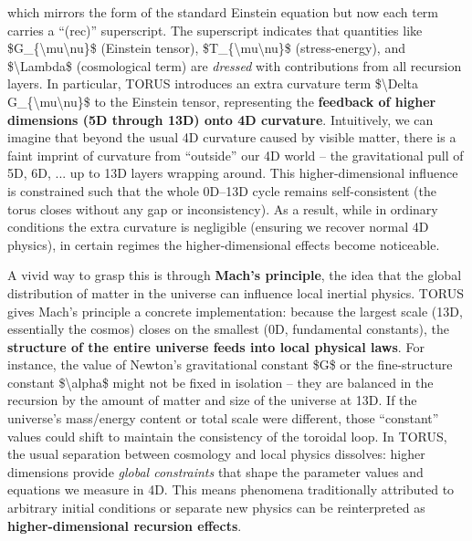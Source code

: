 \documentclass[
]{article}
\begin{document}
which mirrors the form of the standard Einstein equation but now each
term carries a ``(rec)'' superscript\hspace{0pt}. The superscript
indicates that quantities like
\$G\_\{\textbackslash mu\textbackslash nu\}\$ (Einstein tensor),
\$T\_\{\textbackslash mu\textbackslash nu\}\$ (stress-energy), and
\$\textbackslash Lambda\$ (cosmological term) are \emph{dressed} with
contributions from all recursion layers\hspace{0pt}. In particular,
TORUS introduces an extra curvature term \$\textbackslash Delta
G\_\{\textbackslash mu\textbackslash nu\}\$ to the Einstein tensor,
representing the \textbf{feedback of higher dimensions (5D through 13D)
onto 4D curvature}\hspace{0pt}. Intuitively, we can imagine that beyond
the usual 4D curvature caused by visible matter, there is a faint
imprint of curvature from ``outside'' our 4D world -- the gravitational
pull of 5D, 6D, ... up to 13D layers wrapping around. This
higher-dimensional influence is constrained such that the whole 0D--13D
cycle remains self-consistent (the torus closes without any gap or
inconsistency). As a result, while in ordinary conditions the extra
curvature is negligible (ensuring we recover normal 4D physics), in
certain regimes the higher-dimensional effects become noticeable.

A vivid way to grasp this is through \textbf{Mach's principle}, the idea
that the global distribution of matter in the universe can influence
local inertial physics. TORUS gives Mach's principle a concrete
implementation: because the largest scale (13D, essentially the cosmos)
closes on the smallest (0D, fundamental constants), the
\textbf{structure of the entire universe feeds into local physical
laws}\hspace{0pt}. For instance, the value of Newton's gravitational
constant \$G\$ or the fine-structure constant \$\textbackslash alpha\$
might not be fixed in isolation -- they are balanced in the recursion by
the amount of matter and size of the universe at 13D. If the universe's
mass/energy content or total scale were different, those ``constant''
values could shift to maintain the consistency of the toroidal loop. In
TORUS, the usual separation between cosmology and local physics
dissolves: higher dimensions provide \emph{global constraints} that
shape the parameter values and equations we measure in 4D\hspace{0pt}.
This means phenomena traditionally attributed to arbitrary initial
conditions or separate new physics can be reinterpreted as
\textbf{higher-dimensional recursion effects}.
\end{document}

